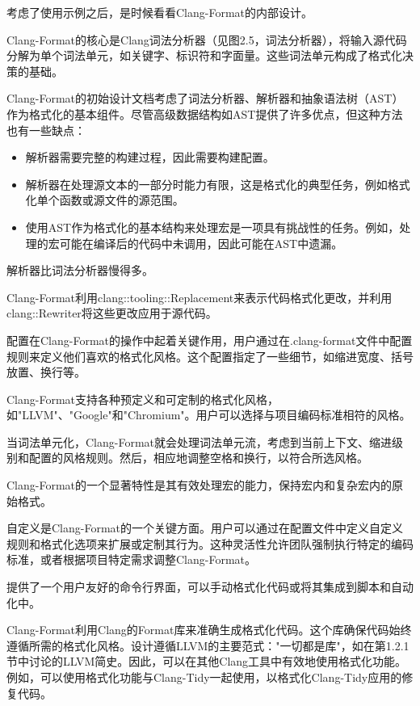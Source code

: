 考虑了使用示例之后，是时候看看Clang-Format的内部设计。


Clang-Format的核心是Clang词法分析器（见图2.5，词法分析器），将输入源代码分解为单个词法单元，如关键字、标识符和字面量。这些词法单元构成了格式化决策的基础。

Clang-Format的初始设计文档考虑了词法分析器、解析器和抽象语法树（AST）作为格式化的基本组件。尽管高级数据结构如AST提供了许多优点，但这种方法也有一些缺点：

\begin{itemize}
\item
解析器需要完整的构建过程，因此需要构建配置。

\item
解析器在处理源文本的一部分时能力有限，这是格式化的典型任务，例如格式化单个函数或源文件的源范围。

\item
使用AST作为格式化的基本结构来处理宏是一项具有挑战性的任务。例如，处理的宏可能在编译后的代码中未调用，因此可能在AST中遗漏。
\end{itemize}

解析器比词法分析器慢得多。

Clang-Format利用clang::tooling::Replacement来表示代码格式化更改，并利用clang::Rewriter将这些更改应用于源代码。

配置在Clang-Format的操作中起着关键作用，用户通过在.clang-format文件中配置规则来定义他们喜欢的格式化风格。这个配置指定了一些细节，如缩进宽度、括号放置、换行等。

Clang-Format支持各种预定义和可定制的格式化风格，如"LLVM"、"Google"和"Chromium"。用户可以选择与项目编码标准相符的风格。

当词法单元化，Clang-Format就会处理词法单元流，考虑到当前上下文、缩进级别和配置的风格规则。然后，相应地调整空格和换行，以符合所选风格。

Clang-Format的一个显著特性是其有效处理宏的能力，保持宏内和复杂宏内的原始格式。

自定义是Clang-Format的一个关键方面。用户可以通过在配置文件中定义自定义规则和格式化选项来扩展或定制其行为。这种灵活性允许团队强制执行特定的编码标准，或者根据项目特定需求调整Clang-Format。

提供了一个用户友好的命令行界面，可以手动格式化代码或将其集成到脚本和自动化中。

Clang-Format利用Clang的Format库来准确生成格式化代码。这个库确保代码始终遵循所需的格式化风格。设计遵循LLVM的主要范式："一切都是库"，如在第1.2.1节中讨论的LLVM简史。因此，可以在其他Clang工具中有效地使用格式化功能。例如，可以使用格式化功能与Clang-Tidy一起使用，以格式化Clang-Tidy应用的修复代码。

